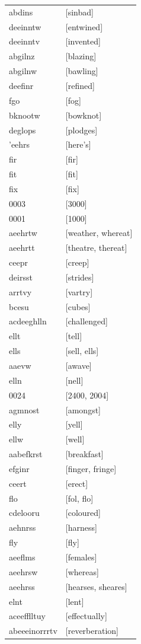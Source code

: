 \documentclass{article}
\begin{document}
\begin{tabular}{ll}
abdins & [sinbad] \\
deeinntw & [entwined] \\
deeinntv & [invented] \\
abgilnz & [blazing] \\
abgilnw & [bawling] \\
deefinr & [refined] \\
fgo & [fog] \\
bknootw & [bowknot] \\
deglops & [plodges] \\
'eehrs & [here's] \\
fir & [fir] \\
fit & [fit] \\
fix & [fix] \\
0003 & [3000] \\
0001 & [1000] \\
aeehrtw & [weather, whereat] \\
aeehrtt & [theatre, thereat] \\
ceepr & [creep] \\
deirsst & [strides] \\
arrtvy & [vartry] \\
bcesu & [cubes] \\
acdeeghlln & [challenged] \\
ellt & [tell] \\
ells & [sell, ells] \\
aaevw & [awave] \\
elln & [nell] \\
0024 & [2400, 2004] \\
agmnost & [amongst] \\
elly & [yell] \\
ellw & [well] \\
aabefkrst & [breakfast] \\
efginr & [finger, fringe] \\
ceert & [erect] \\
flo & [fol, flo] \\
cdelooru & [coloured] \\
aehnrss & [harness] \\
fly & [fly] \\
aeeflms & [females] \\
aeehrsw & [whereas] \\
aeehrss & [hearses, sheares] \\
elnt & [lent] \\
aceefflltuy & [effectually] \\
abeeeinorrrtv & [reverberation] \\

\end{tabular}
\end{document}
